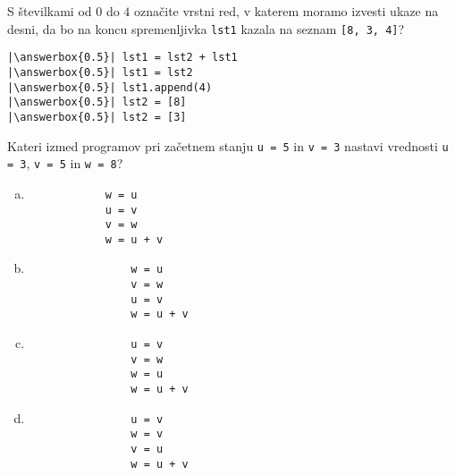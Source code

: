 \documentclass[arhiv, 10pt]{../izpit}
\newcommand{\inlinepy}[1]{\texttt{#1}}
\newcommand{\answerbox}[1]{\framebox{\vphantom{\large M}\hspace{#1cm}}}
\begin{document}
        \naloga*
        \begin{multicols}{2}
        \noindent 
        S številkami od $0$ do $4$ označite vrstni red, v katerem moramo izvesti ukaze na desni, da bo na koncu spremenljivka \inlinepy{lst1} kazala na seznam \inlinepy{[8, 3, 4]}?
    
        \columnbreak
        \noindent
        \begin{verbatim}
|\answerbox{0.5}| lst1 = lst2 + lst1
|\answerbox{0.5}| lst1 = lst2
|\answerbox{0.5}| lst1.append(4)
|\answerbox{0.5}| lst2 = [8]
|\answerbox{0.5}| lst2 = [3]

        \end{verbatim}
        \end{multicols}
    
            
        \naloga*
        
        Kateri izmed programov pri začetnem stanju
            \inlinepy{u = 5} in
            \inlinepy{v = 3}
        nastavi vrednosti
            \inlinepy{u = 3},
            \inlinepy{v = 5} in
            \inlinepy{w = 8}?
    
        \begin{multicols}{4}
        \begin{enumerate}[(a)]
\item 
            \begin{verbatim}
            w = u
            u = v
            v = w
            w = u + v
            \end{verbatim}
        
\item 
                \begin{verbatim}
                w = u
                v = w
                u = v
                w = u + v
                \end{verbatim}
            
\item 
                \begin{verbatim}
                u = v
                v = w
                w = u
                w = u + v
                \end{verbatim}
            
\item 
                \begin{verbatim}
                u = v
                w = v
                v = u
                w = u + v
                \end{verbatim}
            
\end{enumerate}

        \end{multicols}
    
\end{document}
